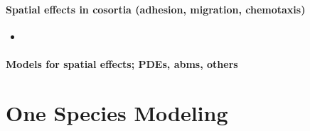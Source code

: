 \documentclass[10pt,A4paper]{article}
\numberwithin{equation}{section}
\begin{document}
\noindent
\paragraph{Spatial effects in cosortia (adhesion, migration, chemotaxis)}
\begin{itemize}
    \item 
\end{itemize}

\noindent
\paragraph{Models for spatial effects; PDEs, \acp{abm}, others}
%
%
%
\section{One Species Modeling}
\end{document}
